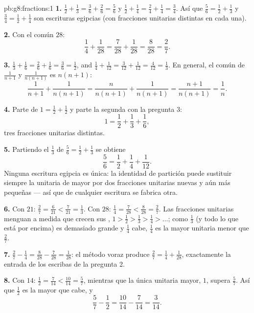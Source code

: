 \begin{solution}{pb:g8:fractions:1}
\textbf{1.} $\frac12 + \frac13 = \frac36 + \frac26 = \frac56$ y
$\frac12 + \frac14 = \frac24 + \frac14 = \frac34$. Así que
$\frac56 = \frac12 + \frac13$ y $\frac34 = \frac12 + \frac14$
son escrituras egipcias (con fracciones unitarias distintas en cada una).

\textbf{2.} Con el  común $28$:
\[
\frac14 + \frac{1}{28} = \frac{7}{28} + \frac{1}{28}
= \frac{8}{28} = \frac{2}{7} .
\]

\textbf{3.} $\frac13 + \frac16 = \frac26 + \frac16 = \frac36 =
\frac12$, and $\frac14 + \frac{1}{12} = \frac{3}{12} +
\frac{1}{12} = \frac{4}{12} = \frac13$. En general, el 
común de $\frac{1}{n+1}$ y $\frac{1}{n(n+1)}$ es
$n(n+1)$:
\[
\frac{1}{n+1} + \frac{1}{n(n+1)}
= \frac{n}{n(n+1)} + \frac{1}{n(n+1)}
= \frac{n+1}{n(n+1)}
= \frac{1}{n} .
\]

\textbf{4.} Parte de $1 = \frac12 + \frac12$ y parte la
segunda  con la pregunta 3:
\[
1 = \frac12 + \frac13 + \frac16 ,
\]
tres fracciones unitarias distintas.

\textbf{5.} Partiendo el $\frac13$ de $\frac56 = \frac12 +
\frac13$ se obtiene
\[
\frac56 = \frac12 + \frac14 + \frac{1}{12} .
\]
Ninguna escritura egipcia es única: la identidad de partición puede
sustituir siempre la  unitaria de  mayor por
dos fracciones unitarias nuevas y aún más pequeñas --- así que de cualquier escritura se
fabrica otra.

\textbf{6.} Con  $21$: $\frac27 = \frac{6}{21} <
\frac{7}{21} = \frac13$. Con  $28$: $\frac14 =
\frac{7}{28} < \frac{8}{28} = \frac27$. Las fracciones unitarias menguan a medida que
crecen sus , $1 > \frac12 > \frac13 > \frac14 >
\dots$; como $\frac13$ (y todo lo que está por encima) es demasiado grande y
$\frac14$ cabe, $\frac14$ es la mayor  unitaria menor
que $\frac27$.

\textbf{7.} $\frac27 - \frac14 = \frac{8}{28} - \frac{7}{28} =
\frac{1}{28}$: el método voraz produce
$\frac27 = \frac14 + \frac{1}{28}$, exactamente la entrada de los escribas de la
pregunta 2.

\textbf{8.} Con  $14$: $\frac12 = \frac{7}{14} <
\frac{10}{14} = \frac57$, mientras que la única  unitaria mayor,
$1$, supera $\frac57$. Así que $\frac12$ es la mayor que cabe,
y
\[
\frac57 - \frac12 = \frac{10}{14} - \frac{7}{14} = \frac{3}{14} .
\]


\end{solution}
